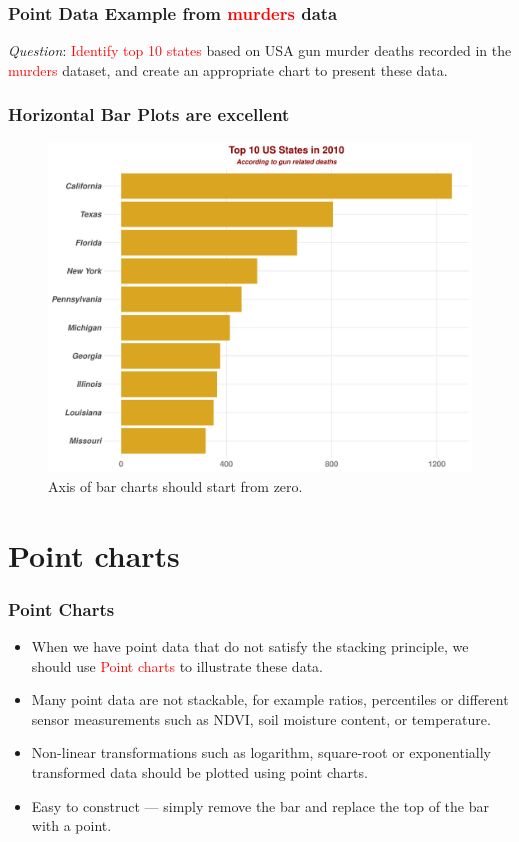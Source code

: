 \documentclass{beamer}
\begin{document}
\begin{frame}\frametitle{Point Data Example from \textcolor{red}{murders} data}
\Large
\textit{Question}: \textcolor{red}{Identify top 10 states} based on USA gun murder deaths recorded in the \textcolor{red}{murders} dataset, and create an appropriate chart to present these data.
\end{frame}


\begin{frame}\frametitle{Horizontal Bar Plots are excellent}
\begin{figure}
\includegraphics[width=0.90\linewidth]{PlotsLec1/BarMurders}
\caption{{\small Axis of bar charts should start from zero}.}
\end{figure}
\end{frame}

\section{Point charts}

\begin{frame}\frametitle{Point Charts}
\begin{itemize}
\item When we have point data that do not satisfy the stacking principle, we should use \textcolor{red}{Point charts} to illustrate these data.
\vspace{0.2in}

\item Many point data are not stackable, for example ratios, percentiles or different sensor measurements such as NDVI, soil moisture content, or temperature.
\vspace{0.2in}

\item Non-linear transformations such as logarithm, square-root or exponentially transformed data should be plotted using point charts.
\vspace{0.2in}

\item Easy to construct --- simply remove the bar and replace the top of the bar with a point. 
\end{itemize}
\end{frame}
\end{document}

